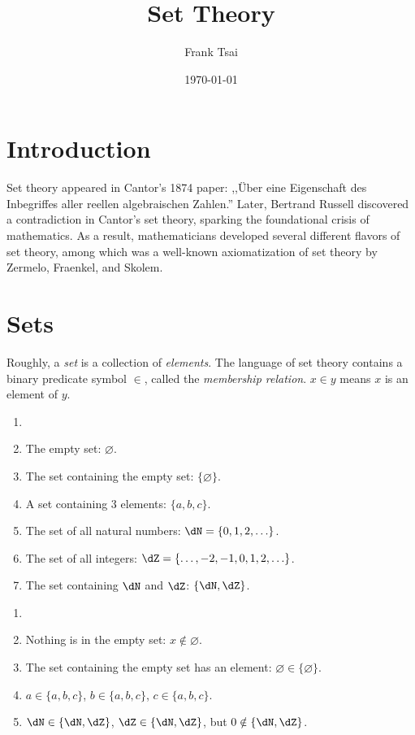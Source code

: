 \documentclass[article,10pt,oneside]{memoir}
\title{Set Theory}
\author{Frank Tsai}
\date{\today}
\begin{document}
\maketitle
\tableofcontents

\section{Introduction}
\label{sec:introduction}

Set theory appeared in Cantor's 1874 paper: ,,\"Uber eine Eigenschaft des Inbegriffes aller reellen algebraischen Zahlen.''
Later, Bertrand Russell discovered a contradiction in Cantor's set theory, sparking the foundational crisis of mathematics.
As a result, mathematicians developed several different flavors of set theory, among which was a well-known axiomatization of set theory by Zermelo, Fraenkel, and Skolem.

\section{Sets}
\label{sec:sets}

Roughly, a \emph{set} is a collection of \emph{elements}.
The language of set theory contains a binary predicate symbol $\in$, called the \emph{membership relation}.
$x \in y$ means $x$ is an element of $y$.

\begin{eg}
  \begin{enumerate}
  \item[]
  \item The empty set: $\varnothing$.
  \item The set containing the empty set: $\{\varnothing\}$.
  \item A set containing 3 elements: $\{ a,b,c \}$.
  \item The set of all natural numbers: $\dN = \{ 0,1,2,\ldots \}$.
  \item The set of all integers: $\dZ = \{ \ldots,-2,-1,0,1,2,\ldots \}$.
  \item The set containing $\dN$ and $\dZ$: $\{ \dN,\dZ \}$.
  \end{enumerate}
\end{eg}

\begin{eg}
  \begin{enumerate}
  \item[]
  \item Nothing is in the empty set: $x \notin \varnothing$.
  \item The set containing the empty set has an element: $\varnothing \in \{\varnothing\}$.
  \item $a \in \{ a, b, c \}$, $b \in \{ a, b, c \}$, $c \in \{ a, b, c \}$.
  \item $\dN \in \{ \dN, \dZ \}$, $\dZ \in \{ \dN, \dZ \}$, but $0 \notin \{ \dN,\dZ \}$.
  \end{enumerate}
\end{eg}
\end{document}
